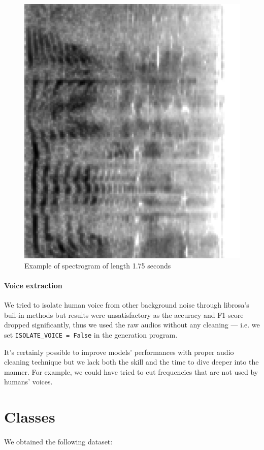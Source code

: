 \begin{figure}[H]
	\centering
	\includegraphics[width=0.7\linewidth, angle=90, interpolate=false]{assets/ex1.big.png}
	\caption{Example of spectrogram of length 1.75 seconds}
	\label{fig:ex2}
\end{figure}

\paragraph{Voice extraction}
We tried to isolate human voice from other background noise through librosa's buil-in methods but results were unsatisfactory as the accuracy and F1-score dropped significantly, thus we used the raw audios without any cleaning --- i.e. we set \texttt{ISOLATE\_VOICE = False} in the generation program.

It's certainly possible to improve models' performances with proper audio cleaning technique but we lack both the skill and the time to dive deeper into the manner. For example, we could have tried to cut frequencies that are not used by humans' voices.

\section{Classes}

\paragraph{}
We obtained the following dataset:

